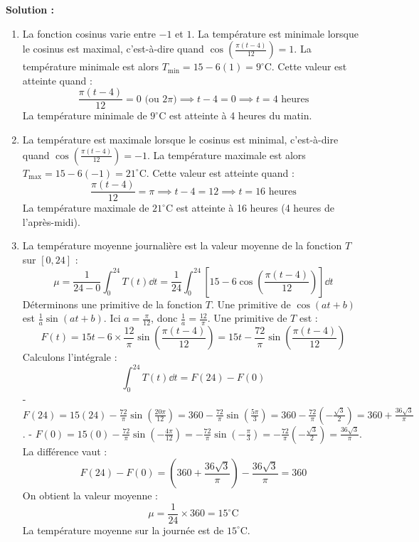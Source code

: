 \textbf{Solution :}
\begin{enumerate}
    \item La fonction cosinus varie entre $-1$ et $1$.
    La température est minimale lorsque le cosinus est maximal, c'est-à-dire quand $\cos\left( \frac{\pi(t - 4)}{12} \right) = 1$.
    La température minimale est alors $T_{\min} = 15 - 6(1) = 9^\circ$C.
    Cette valeur est atteinte quand :
    \[
    \frac{\pi(t - 4)}{12} = 0 \text{ (ou } 2\pi) \implies t - 4 = 0 \implies t = 4 \text{ heures}
    \]
    La température minimale de $9^\circ$C est atteinte à 4 heures du matin.
    
    \item La température est maximale lorsque le cosinus est minimal, c'est-à-dire quand $\cos\left( \frac{\pi(t - 4)}{12} \right) = -1$.
    La température maximale est alors $T_{\max} = 15 - 6(-1) = 21^\circ$C.
    Cette valeur est atteinte quand :
    \[
    \frac{\pi(t - 4)}{12} = \pi \implies t - 4 = 12 \implies t = 16 \text{ heures}
    \]
    La température maximale de $21^\circ$C est atteinte à 16 heures (4 heures de l'après-midi).
    
    \item La température moyenne journalière est la valeur moyenne de la fonction $T$ sur $[0, 24]$ :
    \[
    \mu = \frac{1}{24-0} \int_0^{24} T(t) \dd t = \frac{1}{24} \int_0^{24} \left[ 15 - 6 \cos\left( \frac{\pi(t - 4)}{12} \right) \right] \dd t
    \]
    Déterminons une primitive de la fonction $T$.
    Une primitive de $\cos(at+b)$ est $\frac{1}{a} \sin(at+b)$. Ici $a = \frac{\pi}{12}$, donc $\frac{1}{a} = \frac{12}{\pi}$.
    Une primitive de $T$ est :
    \[
    F(t) = 15t - 6 \times \frac{12}{\pi} \sin\left( \frac{\pi(t - 4)}{12} \right) = 15t - \frac{72}{\pi} \sin\left( \frac{\pi(t - 4)}{12} \right)
    \]
    Calculons l'intégrale :
    \[
    \int_0^{24} T(t) \dd t = F(24) - F(0)
    \]
    - $F(24) = 15(24) - \frac{72}{\pi} \sin\left( \frac{20\pi}{12} \right) = 360 - \frac{72}{\pi} \sin\left( \frac{5\pi}{3} \right) = 360 - \frac{72}{\pi} \left( -\frac{\sqrt{3}}{2} \right) = 360 + \frac{36\sqrt{3}}{\pi}$.
    - $F(0) = 15(0) - \frac{72}{\pi} \sin\left( -\frac{4\pi}{12} \right) = -\frac{72}{\pi} \sin\left( -\frac{\pi}{3} \right) = -\frac{72}{\pi} \left( -\frac{\sqrt{3}}{2} \right) = \frac{36\sqrt{3}}{\pi}$.
    La différence vaut :
    \[
    F(24) - F(0) = \left( 360 + \frac{36\sqrt{3}}{\pi} \right) - \frac{36\sqrt{3}}{\pi} = 360
    \]
    On obtient la valeur moyenne :
    \[
    \mu = \frac{1}{24} \times 360 = 15^\circ\text{C}
    \]
    La température moyenne sur la journée est de $15^\circ$C.
\end{enumerate}

